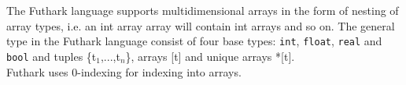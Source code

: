 \documentclass[11pt]{article}
\begin{document}
The Futhark language supports multidimensional arrays in the form of nesting of array types,
i.e. an int array array will contain int arrays and so on.
The general type in the Futhark language consist of four base types: {\tt int}, {\tt float}, {\tt real} and {\tt bool} and tuples \{t$_1$,...,t$_n$\}, arrays [t] and unique arrays *[t].\\

Futhark uses 0-indexing for indexing into arrays.\\ %






{}

\end{document}

